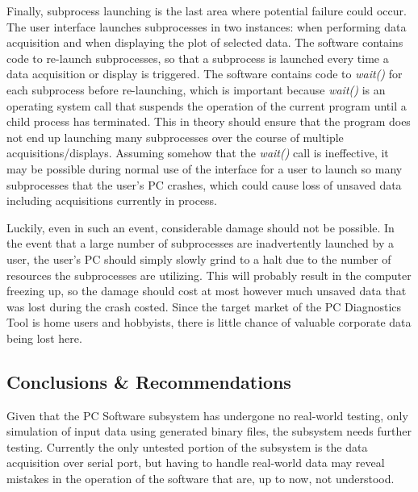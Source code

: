 Finally, subprocess launching is the last area where potential failure could occur. The user interface
launches subprocesses in two instances: when performing data acquisition and when displaying the plot
of selected data. The software contains code to re-launch subprocesses, so that a subprocess is launched
every time a data acquisition or display is triggered. The software contains code to \textit{wait()} 
for each subprocess before re-launching, which is important because \textit{wait()} is an operating system
call that suspends the operation of the current program until a child process has terminated. This in theory
should ensure that the program does not end up launching many subprocesses over the course of multiple 
acquisitions/displays. Assuming somehow that the \textit{wait()} call is ineffective, it may
be possible during normal use of the interface for a user to launch so many subprocesses that the user's
PC crashes, which could cause loss of unsaved data including acquisitions currently in process.

Luckily, even in such an event, considerable damage should not be possible. In the event that a large
number of subprocesses are inadvertently launched by a user, the user's PC should simply slowly grind
to a halt due to the number of resources the subprocesses are utilizing. This will probably result in
the computer freezing up, so the damage should cost at most however much unsaved data that was lost
during the crash costed. Since the target market of the PC Diagnostics Tool is home users and hobbyists,
there is little chance of valuable corporate data being lost here.


\subsection[Conclusions \& Recommendations]{Conclusions \& Recommendations}
Given that the PC Software subsystem has undergone no real-world testing, only 
simulation of input data using generated binary files, the subsystem needs further
testing. Currently the only untested portion of the subsystem is the data acquisition
over serial port, but having to handle real-world data may reveal mistakes in the
operation of the software that are, up to now, not understood.
